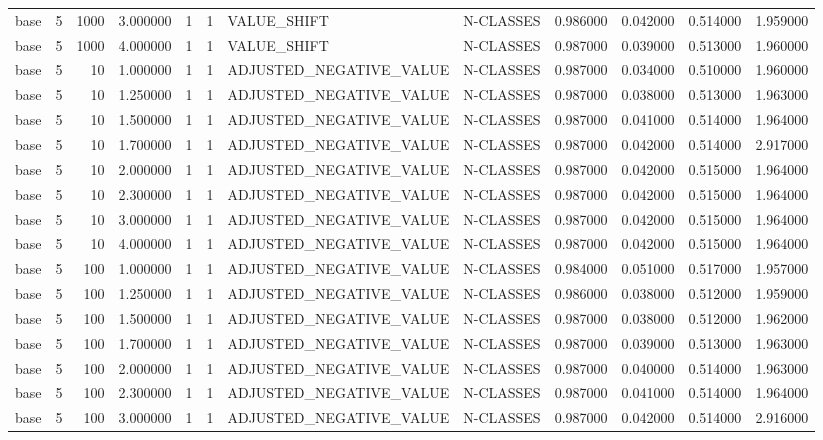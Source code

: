 \begin{tabular}{lrrrllllrrrr}
base & 5 & 1000 & 3.000000 & 1 & 1 & VALUE_SHIFT & N-CLASSES & 0.986000 & 0.042000 & 0.514000 & 1.959000 \\
base & 5 & 1000 & 4.000000 & 1 & 1 & VALUE_SHIFT & N-CLASSES & 0.987000 & 0.039000 & 0.513000 & 1.960000 \\
base & 5 & 10 & 1.000000 & 1 & 1 & ADJUSTED_NEGATIVE_VALUE & N-CLASSES & 0.987000 & 0.034000 & 0.510000 & 1.960000 \\
base & 5 & 10 & 1.250000 & 1 & 1 & ADJUSTED_NEGATIVE_VALUE & N-CLASSES & 0.987000 & 0.038000 & 0.513000 & 1.963000 \\
base & 5 & 10 & 1.500000 & 1 & 1 & ADJUSTED_NEGATIVE_VALUE & N-CLASSES & 0.987000 & 0.041000 & 0.514000 & 1.964000 \\
base & 5 & 10 & 1.700000 & 1 & 1 & ADJUSTED_NEGATIVE_VALUE & N-CLASSES & 0.987000 & 0.042000 & 0.514000 & 2.917000 \\
base & 5 & 10 & 2.000000 & 1 & 1 & ADJUSTED_NEGATIVE_VALUE & N-CLASSES & 0.987000 & 0.042000 & 0.515000 & 1.964000 \\
base & 5 & 10 & 2.300000 & 1 & 1 & ADJUSTED_NEGATIVE_VALUE & N-CLASSES & 0.987000 & 0.042000 & 0.515000 & 1.964000 \\
base & 5 & 10 & 3.000000 & 1 & 1 & ADJUSTED_NEGATIVE_VALUE & N-CLASSES & 0.987000 & 0.042000 & 0.515000 & 1.964000 \\
base & 5 & 10 & 4.000000 & 1 & 1 & ADJUSTED_NEGATIVE_VALUE & N-CLASSES & 0.987000 & 0.042000 & 0.515000 & 1.964000 \\
base & 5 & 100 & 1.000000 & 1 & 1 & ADJUSTED_NEGATIVE_VALUE & N-CLASSES & 0.984000 & 0.051000 & 0.517000 & 1.957000 \\
base & 5 & 100 & 1.250000 & 1 & 1 & ADJUSTED_NEGATIVE_VALUE & N-CLASSES & 0.986000 & 0.038000 & 0.512000 & 1.959000 \\
base & 5 & 100 & 1.500000 & 1 & 1 & ADJUSTED_NEGATIVE_VALUE & N-CLASSES & 0.987000 & 0.038000 & 0.512000 & 1.962000 \\
base & 5 & 100 & 1.700000 & 1 & 1 & ADJUSTED_NEGATIVE_VALUE & N-CLASSES & 0.987000 & 0.039000 & 0.513000 & 1.963000 \\
base & 5 & 100 & 2.000000 & 1 & 1 & ADJUSTED_NEGATIVE_VALUE & N-CLASSES & 0.987000 & 0.040000 & 0.514000 & 1.963000 \\
base & 5 & 100 & 2.300000 & 1 & 1 & ADJUSTED_NEGATIVE_VALUE & N-CLASSES & 0.987000 & 0.041000 & 0.514000 & 1.964000 \\
base & 5 & 100 & 3.000000 & 1 & 1 & ADJUSTED_NEGATIVE_VALUE & N-CLASSES & 0.987000 & 0.042000 & 0.514000 & 2.916000 \\

\end{tabular}
